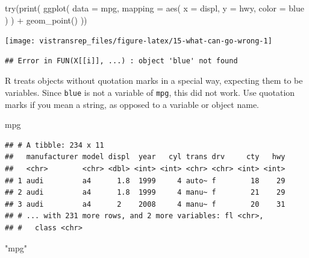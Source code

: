 \documentclass[]{book}
\newenvironment{Shaded}{}{}
\newcommand{\DataTypeTok}[1]{#1}
\newcommand{\KeywordTok}[1]{\textcolor[rgb]{0.00,0.00,1.00}{#1}}
\newcommand{\NormalTok}[1]{#1}
\newcommand{\OperatorTok}[1]{#1}
\newcommand{\StringTok}[1]{\textcolor[rgb]{0.00,0.50,0.50}{#1}}
\begin{document}
\begin{Shaded}
\begin{Highlighting}[]
\KeywordTok{try}\NormalTok{(}\KeywordTok{print}\NormalTok{(}
  \KeywordTok{ggplot}\NormalTok{(}
    \DataTypeTok{data =}\NormalTok{ mpg,}
    \DataTypeTok{mapping =} \KeywordTok{aes}\NormalTok{(}
      \DataTypeTok{x =}\NormalTok{ displ,}
      \DataTypeTok{y =}\NormalTok{ hwy,}
      \DataTypeTok{color =}\NormalTok{ blue}
\NormalTok{    )}
\NormalTok{  ) }\OperatorTok{+}
\StringTok{    }\KeywordTok{geom_point}\NormalTok{()}
\NormalTok{))}
\end{Highlighting}
\end{Shaded}

\begin{flushright}\texttt{[image: vistransrep\_files/figure-latex/15-what-can-go-wrong-1]} \end{flushright}

\begin{verbatim}
## Error in FUN(X[[i]], ...) : object 'blue' not found
\end{verbatim}

R treats objects without quotation marks in a special way, expecting them to be variables.
Since \texttt{blue} is not a variable of \texttt{mpg}, this did not work.
Use quotation marks if you mean a string, as opposed to a variable or object name.

\begin{Shaded}
\begin{Highlighting}[]
\NormalTok{mpg}
\end{Highlighting}
\end{Shaded}

\begin{verbatim}
## # A tibble: 234 x 11
##   manufacturer model displ  year   cyl trans drv     cty   hwy
##   <chr>        <chr> <dbl> <int> <int> <chr> <chr> <int> <int>
## 1 audi         a4      1.8  1999     4 auto~ f        18    29
## 2 audi         a4      1.8  1999     4 manu~ f        21    29
## 3 audi         a4      2    2008     4 manu~ f        20    31
## # ... with 231 more rows, and 2 more variables: fl <chr>,
## #   class <chr>
\end{verbatim}

\begin{Shaded}
\begin{Highlighting}[]
\StringTok{"mpg"}
\end{Highlighting}
\end{Shaded}
\end{document}
